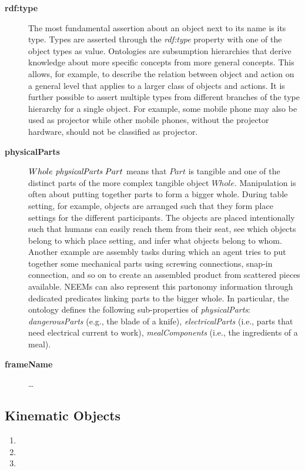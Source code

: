 \begin{description}
\item[\textbf{rdf:type}] 
The most fundamental assertion about an object next to its name is its type.
Types are asserted through the \emph{rdf:type}
property with one of the object types as value.
Ontologies are subsumption hierarchies that derive 
knowledge about more specific concepts from more general concepts.
This allows, for example, to describe the relation between object and action
on a general level that applies to a larger class of objects and actions.
It is further possible to assert multiple types from different branches
of the type hierarchy for a single object.
For example, some mobile phone may also be used as projector while other mobile phones,
without the projector hardware, should not be classified as projector.
\item[\textbf{physicalParts}]
$Whole\ \emph{physicalParts}\ Part$ means
that $Part$ is tangible and one of the distinct parts of the
more complex tangible object $Whole$.
Manipulation is often about putting together parts to form a bigger whole.
During table setting, for example, objects are arranged such that they form
place settings for the different participants.
The objects are placed intentionally such that humans can easily reach them from their seat,
see which objects belong to which place setting, and infer what objects belong to whom.
Another example are assembly tasks during which an agent tries
to put together some mechanical parts using screwing connections, snap-in connection,
and so on to create an assembled product from scattered pieces available.
NEEMs can also represent this partonomy information through dedicated predicates
linking parts to the bigger whole.
In particular, the \ease ontology defines the following sub-properties of \emph{physicalParts}:
\emph{dangerousParts} (e.g., the blade of a knife),
\emph{electricalParts} (i.e., parts that need electrical current to work),
\emph{mealComponents} (i.e., the ingredients of a meal).
\item[\textbf{frameName}] \dots
\end{description}


\subsection{Kinematic Objects}
\begin{enumerate}
 \item {}
 \item {}
 \item {}
\end{enumerate}

